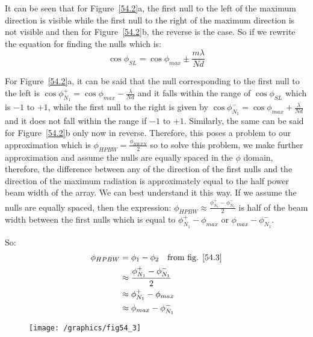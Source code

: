 It can be seen that for Figure~\ref{54.2}a, the first null to the left of the maximum direction  is visible while the first null to the right of the maximum direction is not visible and then for Figure~\ref{54.2}b, the reverse is the case. So if we rewrite the equation for finding the nulls which is:
\begin{equation}
\cos{\phi_{SL}} = \cos{\phi_{max}} \pm \frac{m \lambda}{N d} 
\end{equation}

For Figure~\ref{54.2}a, it can be said that the null corresponding to the first null to the left is $\cos{\phi^+_{N_1}} = \cos{\phi_{max}} - \frac{ \lambda}{N d} $ and it falls within the range of $\cos{\phi_{SL}}$ which is $-1$ to $+1$, while the first null to the right is given by $\cos{\phi^-_{N_1}} = \cos{\phi_{max}} + \frac{ \lambda}{N d} $ and it does not fall within the range if $-1$ to $+1$. Similarly, the same can be said for Figure~\ref{54.2}b only now in reverse. Therefore, this poses a problem to our approximation which is $\phi_{HPBW} = \frac{ \phi_{BWFN}}{2}$ so to solve this problem, we make further approximation and assume the nulls are equally spaced in the $\phi$  domain, therefore, the difference between any of the direction of the first nulls and the direction of the maximum radiation is approximately equal to the half power beam width of the array. We can best understand it this way. If we assume the nulls are equally spaced, then the expression:
$
\phi_{HPBW} \approx \frac{\phi^+_{N_1} - \phi^-_{N_1}}{2}
$
is half of the beam width between the first nulls which is equal to $\phi^+_{N_1} - \phi_{max}$ or  $\phi_{max} - \phi^-_{N_1}$.

So:
\begin{equation}
\begin{split}
\phi_{HPBW} &= \phi_{1}  - \phi_{2}\quad \text{from fig. \ref{54.3}}\\
&\approx \frac{\phi^+_{N_1} - \phi^-_{N_1}}{2} \\
& \approx \phi^+_{N_1} - \phi_{max} \\
& \approx \phi_{max} - \phi^-_{N_1}
\end{split}
\end{equation}

\begin{figure}[h]
\centering
\texttt{[image: /graphics/fig54\_3]}
\caption{}
\label{54.3}
\end{figure}

